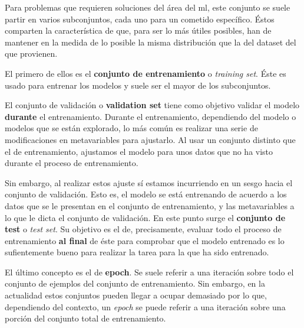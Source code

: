 Para problemas que requieren soluciones del área del \ac{ml}, este conjunto se suele partir en varios subconjuntos, cada uno para un cometido específico. Éstos comparten la característica de que, para ser lo más útiles posibles, han de mantener en la medida de lo posible la misma distribución que la del dataset del que provienen.

El primero de ellos es el \textbf{conjunto de entrenamiento} o \textit{training set}. Éste es usado para entrenar los modelos y suele ser el mayor de los subconjuntos.

El conjunto de validación o \textbf{validation set} tiene como objetivo validar el modelo \textbf{durante} el entrenamiento. Durante el entrenamiento, dependiendo del modelo o modelos que se están explorado, lo más común es realizar una serie de modificaciones en metavariables para ajustarlo. Al usar un conjunto distinto que el de entrenamiento, ajustamos el modelo para unos datos que no ha visto durante el proceso de entrenamiento.

Sin embargo, al realizar estos ajuste sí estamos incurriendo en un sesgo hacia el conjunto de validación. Esto es, el modelo se está entrenando de acuerdo a los datos que se le presentan en el conjunto de entrenamiento, y las metavariables a lo que le dicta el conjunto de validación. En este punto surge el \textbf{conjunto de test} o \textit{test set}. Su objetivo es el de, precisamente, evaluar todo el proceso de entrenamiento \textbf{al final} de éste para comprobar que el modelo entrenado es lo sufientemente bueno para realizar la tarea para la que ha sido entrenado.

El último concepto es el de \textbf{epoch}. Se suele referir a una iteración sobre todo el conjunto de ejemplos del conjunto de entrenamiento. Sin embargo, en la actualidad estos conjuntos pueden llegar a ocupar demasiado por lo que, dependiendo del contexto, un \textit{epoch} se puede referir a una iteración sobre una porción del conjunto total de entrenamiento.

